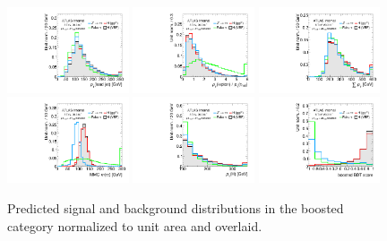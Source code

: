 \begin{figure}[tp]
  \centering
  \includegraphics[width=0.32\textwidth]{figures/overlaid/boost/jet-1-pt}
  \includegraphics[width=0.32\textwidth]{figures/overlaid/boost/taulep-ptratio}
  \includegraphics[width=0.32\textwidth]{figures/overlaid/boost/sumpt}
  \includegraphics[width=0.32\textwidth]{figures/overlaid/boost/mMMC}
  \includegraphics[width=0.32\textwidth]{figures/overlaid/boost/H-pt-hi}
  \includegraphics[width=0.32\textwidth]{figures/overlaid/boost/BDTEve-boost}
  \caption{Predicted signal and background distributions in the boosted category normalized to unit area and overlaid.}
  \label{fig:strategy-overlaid-boost-2}
\end{figure}

